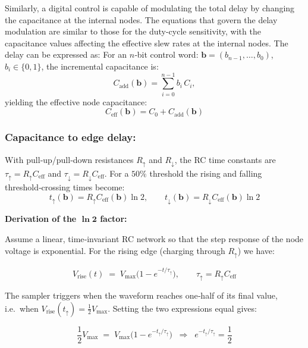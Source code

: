 
Similarly, a digital control is capable of modulating the total delay by changing the capacitance at the internal nodes. The equations that govern the delay modulation are similar to those for the duty-cycle sensitivity, with the capacitance values affecting the effective slew rates at the internal nodes. The delay can be expressed as:
For an $n$‑bit control word:
$\mathbf{b}=(b_{n-1},\ldots,b_0)$, $b_i\!\in\!\{0,1\}$,
the incremental capacitance is:
\[
C_{\mathrm{add}}(\mathbf{b})=\sum_{i=0}^{n-1} b_i\,C_i,
\]
yielding the effective node capacitance:
\begin{equation}
C_{\mathrm{eff}}(\mathbf{b}) = C_0 + C_{\mathrm{add}}(\mathbf{b})
\label{eq:C_eff}
\end{equation}

\subsubsection{Capacitance to edge delay:}

With pull‑up/pull‑down resistances $R_{\uparrow}$ and $R_{\downarrow}$,
the RC time constants are
$\tau_{\uparrow}=R_{\uparrow}C_{\mathrm{eff}}$ and
$\tau_{\downarrow}=R_{\downarrow}C_{\mathrm{eff}}$.
For a $50\%$ threshold the
rising and falling threshold‑crossing times become:
\begin{equation}
t_{\uparrow}(\mathbf{b}) = R_{\uparrow}C_{\mathrm{eff}}(\mathbf{b})\ln 2,
\qquad
t_{\downarrow}(\mathbf{b}) = R_{\downarrow}C_{\mathrm{eff}}(\mathbf{b})\ln 2
\label{eq:t_r_f}
\end{equation}

\textbf{Derivation of the \(\boldsymbol{\ln 2}\) factor:}

Assume a linear, time‑invariant RC network so that the step response of the
node voltage is exponential.  For the rising edge (charging through
\(R_{\uparrow}\)) we have:

\[
V_\text{rise}(t) \;=\; V_{\max}\!\bigl(1-e^{-t/\tau_{\uparrow}}\bigr),
\qquad
\tau_{\uparrow}=R_{\uparrow}C_{\mathrm{eff}}
\]

The sampler triggers when the waveform reaches one‑half of its final value,
i.e.\ when \(V_\text{rise}(t_{\uparrow})=\tfrac{1}{2}V_{\max}\).  Setting
the two expressions equal gives:

\[
\frac{1}{2}V_{\max}
      \;=\;
      V_{\max}\bigl(1-e^{-t_{\uparrow}/\tau_{\uparrow}}\bigr)
\;\;\Longrightarrow\;\;
e^{-t_{\uparrow}/\tau_{\uparrow}} = \frac{1}{2}
\]

